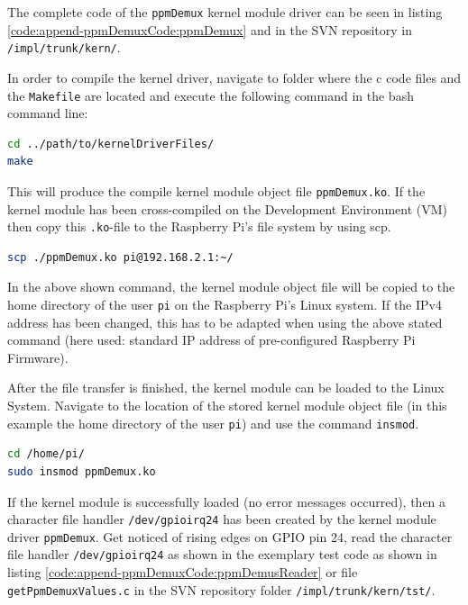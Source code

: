 The complete code of the \texttt{ppmDemux} kernel module driver can be seen in listing \ref{code:append-ppmDemuxCode:ppmDemux} and in the SVN repository in \texttt{/impl/trunk/kern/}.

In order to compile the kernel driver, navigate to folder where the c code files and the \texttt{Makefile} are located and execute the following command in the bash command line:
\begin{lstlisting}[language=bash,otherkeywords={make}]
cd ../path/to/kernelDriverFiles/
make
\end{lstlisting}

This will produce the compile kernel module object file \texttt{ppmDemux.ko}. If the kernel module has been cross-compiled on the Development Environment (VM) then copy this \texttt{.ko}-file to the Raspberry Pi's file system by using scp.
\begin{lstlisting}[language=bash,otherkeywords={scp}]
scp ./ppmDemux.ko pi@192.168.2.1:~/
\end{lstlisting}

In the above shown command, the kernel module object file will be copied to the home directory of the user \texttt{pi} on the Raspberry Pi's Linux system. If the IPv4 address has been changed, this has to be adapted when using the above stated command (here used: standard IP address of pre-configured Raspberry Pi Firmware).

After the file transfer is finished, the kernel module can be loaded to the Linux System. Navigate to the location of the stored kernel module object file (in this example the home directory of the user \texttt{pi}) and use the command \texttt{insmod}.
\begin{lstlisting}[language=bash,otherkeywords={insmod, sudo}]
cd /home/pi/
sudo insmod ppmDemux.ko
\end{lstlisting}

If the kernel module is successfully loaded (no error messages occurred), then a character file handler \texttt{/dev/gpioirq24} has been created by the kernel module driver \texttt{ppmDemux}. Get noticed of rising edges on GPIO pin 24, read the character file handler \texttt{/dev/gpioirq24} as shown in the exemplary test code as shown in listing \ref{code:append-ppmDemuxCode:ppmDemusReader} or file \texttt{getPpmDemuxValues.c} in the SVN repository folder \texttt{/impl/trunk/kern/tst/}.

